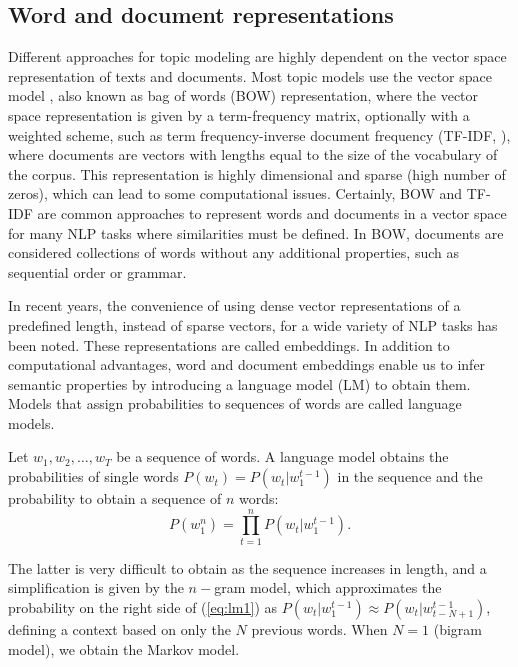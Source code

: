 \documentclass{article}
\begin{document}
\subsection{Word and document representations}

Different approaches for topic modeling are highly dependent on the vector space representation of texts and documents. Most topic models use the vector space model \citep{salton1975}, also known as bag of words (BOW) representation, where the vector space representation is given by a term-frequency matrix, optionally with a weighted scheme, such as  term frequency-inverse document frequency (TF-IDF, \cite{salton_tfidf88}), where documents are vectors with lengths equal to the size of the vocabulary of the corpus. This representation is highly dimensional and sparse (high number of zeros), which can lead to some computational issues. Certainly, BOW and TF-IDF are common approaches to represent words and documents in a vector space for many NLP tasks where similarities must be defined. In BOW, documents are considered collections of words without any additional properties, such as sequential order or grammar.

In recent years, the convenience of using dense vector representations of a predefined length, instead of sparse vectors, for a wide variety of NLP tasks has been noted. These representations are called embeddings. In addition to computational advantages, word and document embeddings enable us to infer semantic properties by introducing a language model (LM) to obtain them. Models that assign probabilities to sequences of words are called language models. 

Let $w_1,w_2,\ldots,w_T$ be a sequence of words. A language model obtains the probabilities of single words $P(w_t)= P(w_t|w_1^{t-1})$ in the sequence and the  probability to obtain a sequence of $n$ words: 
\begin{equation}\label{eq:lm1}
    P(w_1^n)=\displaystyle \prod_{t=1}^n P(w_t|w_1^{t-1}).
\end{equation}

The latter is very difficult to obtain as the sequence increases in length, and a simplification is given by the $n-$gram model, which approximates the probability on the right side of (\ref{eq:lm1}) as $P(w_t|w_1^{t-1}) \approx P\left(w_t|w_{t-N+1}^{t-1}\right)$, defining a context based on only the $N$ previous words. When $N=1$ (bigram model), we obtain the Markov model.
\end{document}

